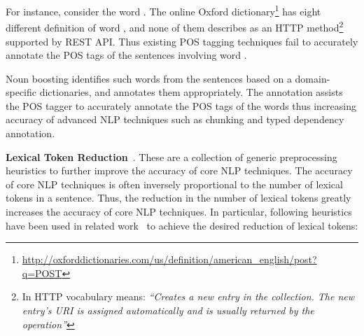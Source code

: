 For instance, consider the word . 
The online Oxford dictionary\footnote{\url{http://oxforddictionaries.com/us/definition/american_english/post?q=POST}} has eight different definition of word , and none of them describes  as an HTTP method\footnote{In HTTP vocabulary  means: \textit{``Creates a new entry in the collection.
The new entry's URI is assigned automatically and is usually returned by the operation''}}
supported by REST API.
Thus existing POS tagging techniques fail to accurately annotate the POS tags of the sentences involving word .  

Noun boosting identifies such words from the sentences based on a domain-specific dictionaries, and annotates them appropriately.
The annotation assists the POS tagger to accurately annotate the POS tags of the words thus increasing accuracy of advanced NLP techniques such as chunking and typed dependency annotation.

\textbf{Lexical Token Reduction}~\cite{pandita13:WHYPER}.
These are a collection of generic preprocessing heuristics to further improve the accuracy of core NLP techniques.
The accuracy of core NLP techniques is often inversely proportional to the number of lexical tokens in a sentence.
Thus, the reduction in the number of lexical tokens greatly increases the accuracy of core NLP techniques. 
In particular, following heuristics have been used in related work~\cite{pandita12:inferring,pandita13:WHYPER} to achieve the desired reduction of lexical tokens:

